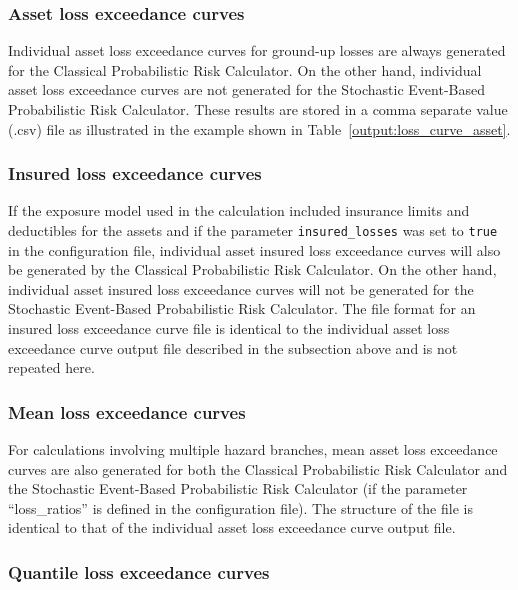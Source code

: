 \subsubsection{Asset loss exceedance curves}
\label{subsubsec:asset_loss_curves}

Individual asset loss exceedance curves for ground-up losses are always
generated for the Classical Probabilistic Risk Calculator. On the other hand,
individual asset loss exceedance curves are not generated for the Stochastic
Event-Based Probabilistic Risk Calculator. These results are stored in a comma
separate value (.csv) file as illustrated in the example shown in
Table~\ref{output:loss_curve_asset}.



\subsubsection{Insured loss exceedance curves}
\label{subsubsec:insured_loss_curves}

If the exposure model used in the calculation included insurance limits and
deductibles for the assets and if the parameter \Verb+insured_losses+ was set
to \Verb+true+ in the configuration file, individual asset insured loss
exceedance curves will also be generated by the Classical Probabilistic Risk
Calculator. On the other hand, individual asset insured loss exceedance curves
will not be generated for the Stochastic Event-Based Probabilistic Risk
Calculator. The file format for an insured loss exceedance curve file
is identical to the individual asset loss exceedance curve output file
described in the subsection above and is not repeated here.

\subsubsection{Mean loss exceedance curves}
\label{subsubsec:mean_loss_curves}

For calculations involving multiple hazard branches, mean asset loss
exceedance curves are also generated for both the Classical Probabilistic Risk
Calculator and the Stochastic Event-Based Probabilistic Risk Calculator (if
the parameter ``loss\_ratios'' is defined in the configuration file). The
structure of the file is identical to that of the individual asset loss
exceedance curve output file.

\subsubsection{Quantile loss exceedance curves}
\label{subsubsec:quantile_loss_curves}


